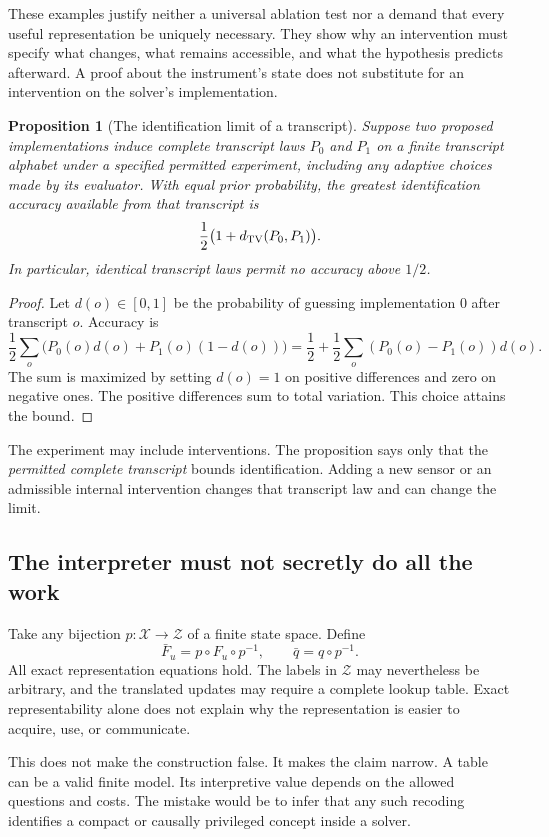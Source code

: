 \documentclass[11pt,letterpaper]{article}
\theoremstyle{plain}
\newtheorem{proposition}[theorem]{Proposition}
\theoremstyle{definition}
\newcommand{\X}{\mathcal X}\newcommand{\Z}{\mathcal Z}
\begin{document}
These examples justify neither a universal ablation test nor a demand that every useful representation be uniquely necessary. They show why an intervention must specify what changes, what remains accessible, and what the hypothesis predicts afterward. A proof about the instrument's state does not substitute for an intervention on the solver's implementation.

\begin{proposition}[The identification limit of a transcript]\label{prop:identification}
Suppose two proposed implementations induce complete transcript laws $P_0$ and $P_1$ on a finite transcript alphabet under a specified permitted experiment, including any adaptive choices made by its evaluator. With equal prior probability, the greatest identification accuracy available from that transcript is
\[
\frac12\bigl(1+d_{\mathrm{TV}}(P_0,P_1)\bigr).
\]
In particular, identical transcript laws permit no accuracy above $1/2$.
\end{proposition}
\begin{proof}
Let $d(o)\in[0,1]$ be the probability of guessing implementation 0 after transcript $o$. Accuracy is
\[
\frac12\sum_o\bigl(P_0(o)d(o)+P_1(o)(1-d(o))\bigr)
=\frac12+\frac12\sum_o(P_0(o)-P_1(o))d(o).
\]
The sum is maximized by setting $d(o)=1$ on positive differences and zero on negative ones. The positive differences sum to total variation. This choice attains the bound.
\end{proof}
The experiment may include interventions. The proposition says only that the \emph{permitted complete transcript} bounds identification. Adding a new sensor or an admissible internal intervention changes that transcript law and can change the limit.

\subsection{The interpreter must not secretly do all the work}
Take any bijection $p:\X\to\Z$ of a finite state space. Define
\[
\bar F_u=p\circ F_u\circ p^{-1},\qquad \bar q=q\circ p^{-1}.
\]
All exact representation equations hold. The labels in $\Z$ may nevertheless be arbitrary, and the translated updates may require a complete lookup table. Exact representability alone does not explain why the representation is easier to acquire, use, or communicate.

This does not make the construction false. It makes the claim narrow. A table can be a valid finite model. Its interpretive value depends on the allowed questions and costs. The mistake would be to infer that any such recoding identifies a compact or causally privileged concept inside a solver.
\end{document}
